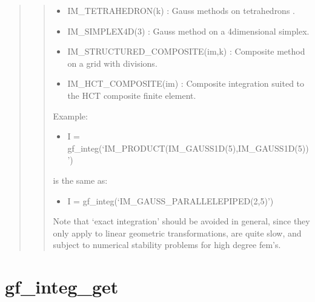 \documentclass[a4paper,11pt,english]{sphinxmanual}
\begin{document}
\begin{quote}
\begin{quote}
\begin{itemize}
\item {} 
\sphinxAtStartPar
IM\_TETRAHEDRON(k) :
Gauss methods on tetrahedrons .

\item {} 
\sphinxAtStartPar
IM\_SIMPLEX4D(3) :
Gauss method on a 4\sphinxhyphen{}dimensional simplex.

\item {} 
\sphinxAtStartPar
IM\_STRUCTURED\_COMPOSITE(im,k) :
Composite method on a grid with  divisions.

\item {} 
\sphinxAtStartPar
IM\_HCT\_COMPOSITE(im) :
Composite integration suited to the HCT composite finite element.

\end{itemize}

\sphinxAtStartPar
Example:
\begin{itemize}
\item {} 
\sphinxAtStartPar
I = gf\_integ(‘IM\_PRODUCT(IM\_GAUSS1D(5),IM\_GAUSS1D(5))’)

\end{itemize}

\sphinxAtStartPar
is the same as:
\begin{itemize}
\item {} 
\sphinxAtStartPar
I = gf\_integ(‘IM\_GAUSS\_PARALLELEPIPED(2,5)’)

\end{itemize}

\sphinxAtStartPar
Note that ‘exact integration’ should be avoided in general, since they
only apply to linear geometric transformations, are quite slow, and
subject to numerical stability problems for high degree fem’s.
\end{quote}
\end{quote}


\section{gf\_integ\_get}
\label{\detokenize{matlab_octave/cmdref_gf_integ_get:gf-integ-get}}\label{\detokenize{matlab_octave/cmdref_gf_integ_get::doc}}
\sphinxAtStartPar
{}
\end{document}
